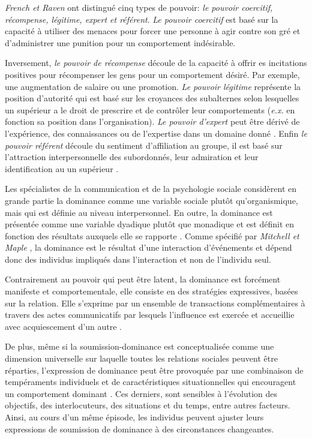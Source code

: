 		\emph{French et Raven}\cite{french1959bases} ont distingué cinq types de pouvoir: \textit{le pouvoir coercitif, récompense, légitime, expert et référent}. 
		\textit{Le pouvoir coercitif} est basé sur la capacité à utiliser des menaces pour forcer une personne à agir contre son gré et d'administrer une punition pour un comportement indésirable.
		
		Inversement, \textit{le pouvoir de récompense} découle de la capacité à offrir es incitations positives pour récompenser les gens pour un comportement désiré. Par exemple, une augmentation de salaire ou une promotion.
		\textit{Le pouvoir légitime} représente la position d'autorité qui est basé sur les croyances des subalternes selon lesquelles un supérieur a le droit de prescrire et de contrôler leur comportements (\emph{e.x.} en fonction sa position dans l'organisation). 
		\textit{Le pouvoir d'expert} peut être dérivé de l'expérience, des connaissances ou de l'expertise dans un domaine donné \cite{van2006power}. 
		Enfin \textit{le pouvoir référent} découle du sentiment d'affiliation au groupe, il est basé sur l'attraction interpersonnelle des subordonnés, leur admiration et leur identification au un supérieur \cite{van2006power}.
	
		Les spécialistes de la communication et de la psychologie sociale considèrent en grande partie la dominance comme une variable sociale plutôt qu'organismique, mais qui est définie au niveau interpersonnel. En outre, la dominance est présentée comme une variable dyadique plutôt que monadique et est définit en fonction des résultats auxquels elle se rapporte  \cite{burgoon1998nature,burgoon2006nonverbal}.
		Comme spécifié par \emph{Mitchell et Maple} \cite{smither1993authoritarianism}, la dominance est le résultat d'une interaction d'événements et dépend donc des individus impliqués dans l'interaction et non de l'individu seul.
		
	 	Contrairement au pouvoir qui peut être latent, la dominance est forcément manifeste et comportementale, elle consiste en des stratégies expressives, basées sur la relation. Elle s'exprime par un ensemble de transactions complémentaires à travers des actes communicatifs par lesquels l'influence est exercée et accueillie avec acquiescement d'un autre \cite{burgoon2000interactionist,millar1987relational}. 
		
		De plus, même si la soumission-dominance est conceptualisée comme une dimension universelle sur laquelle toutes les relations sociales peuvent être réparties, l'expression de dominance peut être provoquée par une combinaison de tempéraments individuels et de caractéristiques situationnelles	qui encouragent un comportement dominant \cite{burgoon2000interactionist}. Ces derniers, sont sensibles à l'évolution des objectifs, des interlocuteurs, des situations et du temps, entre autres facteurs.
		Ainsi, au cours d'un même épisode, les individus peuvent ajuster leurs expressions de soumission de dominance à des circonstances changeantes.
		
